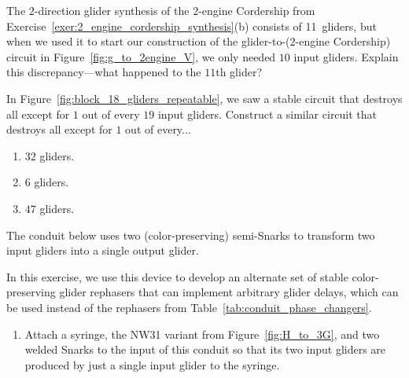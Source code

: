 \begin{multicols}{2}
	
	\begin{problemstar}\label{exer:g_to_2engine_why_10_gliders} 
		The $2$-direction glider synthesis of the $2$-engine Cordership from Exercise~\ref{exer:2_engine_cordership_synthesis}(b) consists of 11~gliders, but when we used it to start our construction of the glider-to-($2$-engine Cordership) circuit in Figure~\ref{fig:g_to_2engine_V}, we only needed $10$ input gliders. Explain this discrepancy---what happened to the $11$th glider?
	\end{problemstar}
	
	
	\mfilbreak
	
	
	\begin{problem}\label{exer:stable_thin_out_gliders} 
		In Figure~\ref{fig:block_18_gliders_repeatable}, we saw a stable circuit that destroys all except for $1$ out of every $19$ input gliders. Construct a similar circuit that destroys all except for $1$ out of every...\smallskip
		
		\begin{enumerate}[label=\bf\color{ocre}(\alph*)]
			\item $32$ gliders.
			
			\item $6$ gliders.
			
			\item $47$ gliders.
		\end{enumerate}
	\end{problem}


	\mfilbreak
	
	
	\begin{problemstar}\label{exer:other_toolkit_from_semi_snarks} 
		The conduit below uses two (color-preserving) semi-Snarks to transform two input gliders into a single output glider.
		
		\begin{center}
		\end{center}
	
		\noindent In this exercise, we use this device to develop an alternate set of stable color-preserving glider rephasers that can implement arbitrary glider delays, which can be used instead of the rephasers from Table~\ref{tab:conduit_phase_changers}.\smallskip
		
		\begin{enumerate}[label=\bf\color{ocre}(\alph*)]
			\item Attach a syringe, the NW31 variant from Figure~\ref{fig:H_to_3G}, and two welded Snarks to the input of this conduit so that its two input gliders are produced by just a single input glider to the syringe.
			

\end{enumerate}
\end{problemstar}
\end{multicols}
